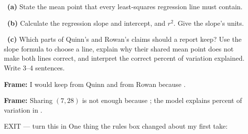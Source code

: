\documentclass[11pt]{article}
\begin{document}
~\textbf{(a)} State the mean point that every least-squares regression line must contain.\par
\workspace{0.55in}

~\textbf{(b)} Calculate the regression slope and intercept, and $r^2$. Give the slope's units.\par
\workspace{1.0in}

~\textbf{(c)} Which parts of Quinn's and Rowan's claims should a report keep? Use the slope formula to choose a line, explain why their shared mean point does not make both lines correct, and interpret the correct percent of variation explained. Write 3--4 sentences.\par
\workspace{1.45in}

\begin{sentenceframebox}\raggedright\textbf{Frame:} I would keep \blank[1.6in] from Quinn and \blank[1.6in] from Rowan because \blank[1.7in].\end{sentenceframebox}

\begin{sentenceframebox}\raggedright\textbf{Frame:} Sharing $(7,28)$ is not enough because \blank[2.0in]; the model explains \blank[0.6in] percent of variation in \blank[1.4in].\end{sentenceframebox}

\begin{summaryexitbox}{EXIT --- turn this in}
One thing the rules box changed about my first take: \hrulefill\par
\workspace{0.4in}
\end{summaryexitbox}
\end{document}
